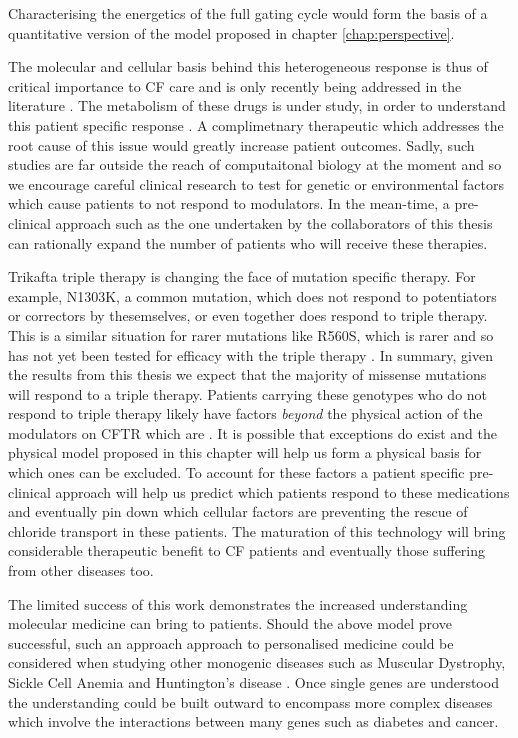 Characterising the energetics of the full gating cycle would form the basis of a quantitative version of the model proposed in chapter \ref{chap:perspective}.


The molecular and cellular basis behind this heterogeneous response is thus of critical importance to CF care and is only recently being addressed in the literature \cite{}. The metabolism of these drugs is under study, in order to understand this patient specific response \cite{hanafin2021}. A complimetnary therapeutic which addresses the root cause of this issue would greatly increase patient outcomes. Sadly, such studies are far outside the reach of computaitonal biology at the moment and so we encourage careful clinical research to test for genetic or environmental factors which cause patients to not respond to modulators. In the mean-time, a pre-clinical approach such as the one undertaken by the collaborators of this thesis can rationally expand the number of patients who will receive these therapies.

Trikafta triple therapy is changing the face of mutation specific therapy. For example, N1303K, a common mutation, which does not respond to potentiators or correctors by thesemselves, or even together \cite{} does respond to triple therapy. This is a similar situation for rarer mutations like R560S, which is rarer and so has not yet been tested for efficacy with the triple therapy \cite{awatade2019}. In summary, given the results from this thesis we expect that the majority of missense mutations will respond to a triple therapy. Patients carrying these genotypes who do not respond to triple therapy likely have factors \textit{beyond} the physical action of the modulators on CFTR which are . It is possible that exceptions do exist and the physical model proposed in this chapter will help us form a physical basis for which ones can be excluded. To account for these factors a patient specific pre-clinical approach will help us predict which patients respond to these medications and eventually pin down which cellular factors are preventing the rescue of chloride transport in these patients. The maturation of this technology will bring considerable therapeutic benefit to CF patients and eventually those suffering from other diseases too.

The limited success of this work demonstrates the increased understanding molecular medicine can bring to patients. Should the above model prove successful, such an approach approach to personalised medicine could  be considered when studying other monogenic diseases such as Muscular Dystrophy, Sickle Cell Anemia and Huntington's disease \cite{}.  Once single genes are understood the understanding could be built outward to encompass more complex diseases which involve the interactions between many genes such as diabetes and cancer. 

